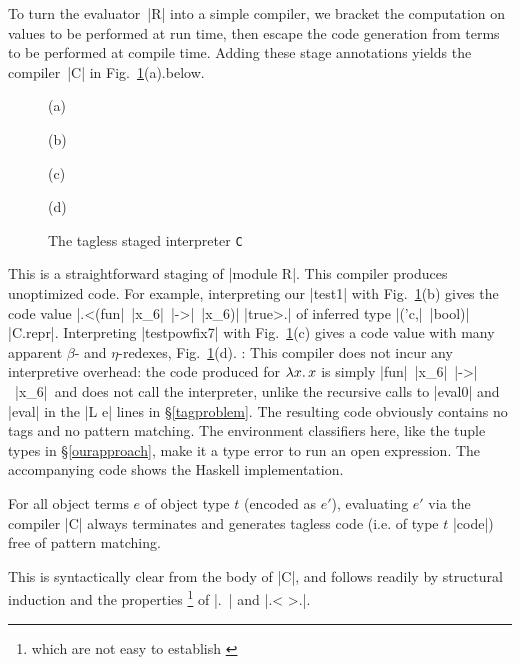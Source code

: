 To turn the evaluator~|R| into a simple compiler, we bracket the
computation on values to be performed at run time, then escape the code
generation from terms to be performed at compile time.  Adding these
stage annotations yields the compiler~|C|
\ifshort in Fig.~\ref{fig:interpreter-C}(a).\else below.
\fi
\ifshort
\begin{figure}[t]
(a) 

\smallskip
(b) 

\smallskip
(c) 

\smallskip
(d) 

\medskip
\caption{The tagless staged interpreter \texttt{C}}
\label{fig:interpreter-C}
\end{figure}
\fi
This is a straightforward staging of
|module R|.
This compiler produces
unoptimized code. For example, interpreting our |test1| with
\ifshort Fig.~\ref{fig:interpreter-C}(b) \else {}\fi
gives the code value |.<(fun|~|x_6|~|->|~|x_6)| |true>.|
of inferred type |('c,|~|bool)| |C.repr|.  Interpreting |testpowfix7|
with
\ifshort Fig.~\ref{fig:interpreter-C}(c) \else {}\fi
gives a code value with many apparent $\beta$- and $\eta$-redexes\ifshort,
Fig.~\ref{fig:interpreter-C}(d). \else: \fi
This compiler does not incur
any interpretive overhead: the
code produced for $\mathopen{\lambda\mathord{x}.\,}x$ is simply |fun|~|x_6|~|->|~|x_6|\ifshort\else\
and does not
call the interpreter, unlike the recursive calls to |eval0| and
|eval| in the |L e| lines in \S\ref{tagproblem}\fi.
The resulting code obviously contains no tags and no pattern matching.
The environment classifiers here, like the tuple types in \S\ref{ourapproach},
make it a type error to run an open expression.
\ifshort
The accompanying code shows the Haskell implementation. 
\else
\begin{proposition}
    For all object terms $e$ of object type $t$ (encoded as $e'$),
    evaluating $e'$ via the compiler |C| always terminates and
    generates tagless code (i.e. of type $t$ |code|) free of pattern matching.
\end{proposition}
This is syntactically clear from the body of |C|, and follows
readily by structural induction and the properties%
\footnote{which are not easy to establish \citep{MetaML}} of |.~| and
|.< >.|.

